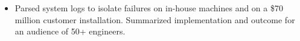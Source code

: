 \documentclass[12pt,letterpaper]{article}
\newcommand{\CPP}{C\nolinebreak[4]\hspace{-.05em}\raisebox{.22ex}{\footnotesize\bf ++}\xspace}
\begin{document}
\begin{itemize}[leftmargin=\parindent]
\begin{itemize}[leftmargin=\parindent]

            \item Parsed system logs to isolate failures on in-house machines and on a \$70 million customer installation. Summarized implementation and outcome for an audience of 50+ engineers.








\end{itemize}
\end{itemize}
\end{document}
